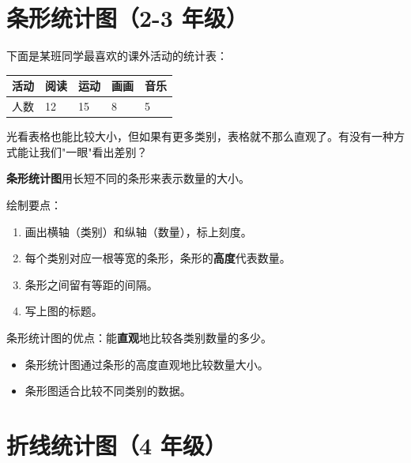 \section*{条形统计图（2-3 年级）}


\begin{explore}


下面是某班同学最喜欢的课外活动的统计表：

\begin{center}
\begin{tabular}{lllll}
\toprule
活动 & 阅读 & 运动 & 画画 & 音乐 \\
\midrule
人数 & 12 & 15 & 8 & 5 \\
\bottomrule
\end{tabular}
\end{center}


光看表格也能比较大小，但如果有更多类别，表格就不那么直观了。有没有一种方式能让我们"一眼"看出差别？

\end{explore}

\begin{understand}


\textbf{条形统计图}用长短不同的条形来表示数量的大小。

绘制要点：
\begin{enumerate}
  \item 画出横轴（类别）和纵轴（数量），标上刻度。
  \item 每个类别对应一根等宽的条形，条形的\textbf{高度}代表数量。
  \item 条形之间留有等距的间隔。
  \item 写上图的标题。
\end{enumerate}


条形统计图的优点：能\textbf{直观}地比较各类别数量的多少。

\end{understand}

\begin{keytakeaway}


\begin{itemize}
  \item 条形统计图通过条形的高度直观地比较数量大小。
  \item 条形图适合比较不同类别的数据。
\end{itemize}


\end{keytakeaway}



\section*{折线统计图（4 年级）}


